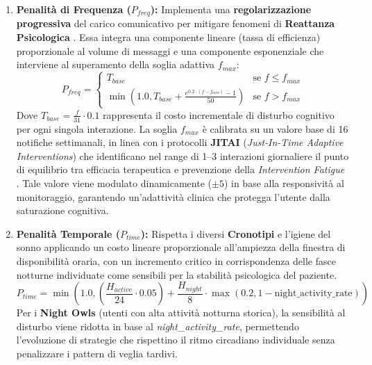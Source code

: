 \begin{enumerate}
    \item \textbf{Penalità di Frequenza ($P_{freq}$):} Implementa una \textbf{regolarizzazione progressiva} del carico comunicativo per mitigare fenomeni di \textbf{Reattanza Psicologica} \cite{brehm1966theory}. Essa integra una componente lineare (tassa di efficienza) proporzionale al volume di messaggi e una componente esponenziale che interviene al superamento della soglia adattiva $f_{max}$:
          \begin{equation}
              P_{freq} =
              \begin{cases}
                  T_{base}                                                                    & \text{se } f \leq f_{max} \\
                  \min\left(1.0, T_{base} + \frac{e^{0.2 \cdot (f - f_{max})} - 1}{50}\right) & \text{se } f > f_{max}
              \end{cases}
          \end{equation}
          Dove $T_{base} = \frac{f}{31} \cdot 0.1$ rappresenta il costo incrementale di disturbo cognitivo per ogni singola interazione. La soglia $f_{max}$ è calibrata su un valore base di 16 notifiche settimanali, in linea con i protocolli \textbf{JITAI} (\textit{Just-In-Time Adaptive Interventions}) che identificano nel range di 1--3 interazioni giornaliere il punto di equilibrio tra efficacia terapeutica e prevenzione della \textit{Intervention Fatigue} \cite{nahum2018just}. Tale valore viene modulato dinamicamente ($\pm 5$) in base alla responsività al monitoraggio, garantendo un'adattività clinica che protegga l'utente dalla saturazione cognitiva.

    \item \textbf{Penalità Temporale ($P_{time}$):} Rispetta i diversi \textbf{Cronotipi} e l'igiene del sonno applicando un costo lineare proporzionale all'ampiezza della finestra di disponibilità oraria, con un incremento critico in corrispondenza delle fasce notturne individuate come sensibili per la stabilità psicologica del paziente.
          \begin{equation}
              P_{time} = \min\left(1.0, (\frac{H_{active}}{24} \cdot 0.05) + \frac{H_{night}}{8} \cdot \max(0.2, 1 - \text{night\_activity\_rate})\right)
          \end{equation}
          Per i \textbf{Night Owls} (utenti con alta attività notturna storica), la sensibilità al disturbo viene ridotta in base al \textit{night\_activity\_rate}, permettendo l'evoluzione di strategie che rispettino il ritmo circadiano individuale senza penalizzare i pattern di veglia tardivi.
\end{enumerate}


